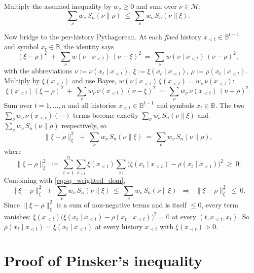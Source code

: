 \documentclass[fontsize=11pt, parskip=half]{scrartcl}
\renewcommand{\thesection}{\arabic{section}}
\newcommand{\Mc}{\mathcal{M}}
\newcommand{\Sn}[2]{S_{n}(#1 \parallel #2)}
\begin{document}
\begin{solution}
Multiply the assumed inequality by $w_\nu \geq 0$ and sum over $\nu \in \Mc$:
\begin{equation}\label{eq:sq_weighted_dom}
  \sum_\nu w_\nu\,\Sn{\nu}{\rho}
  ~\leq~
  \sum_\nu w_\nu\,\Sn{\nu}{\xi}.
\end{equation}

Now bridge to the per-history Pythagorean. At each \emph{fixed} history $x_{<t}
\in \mathbb{B}^{t-1}$ and symbol $x_t \in \mathbb{B}$, the identity says
\[
  (\xi - \rho)^2 \;+\; \sum_\nu w(\nu \mid x_{<t})\,(\nu - \xi)^2
  ~=~ \sum_\nu w(\nu \mid x_{<t})\,(\nu - \rho)^2,
\]
with the abbreviations $\nu := \nu(x_t \mid x_{<t})$, $\xi := \xi(x_t \mid x_{<t})$,
$\rho := \rho(x_t \mid x_{<t})$. Multiply by $\xi(x_{<t})$ and use Bayes,
$w(\nu \mid x_{<t})\,\xi(x_{<t}) = w_\nu \,\nu(x_{<t})$:
\[
  \xi(x_{<t})(\xi - \rho)^2
  \;+\; \sum_\nu w_\nu \,\nu(x_{<t})\,(\nu - \xi)^2
  ~=~ \sum_\nu w_\nu \,\nu(x_{<t})\,(\nu - \rho)^2.
\]
Sum over $t = 1, \dots, n$ and all histories $x_{<t} \in \mathbb{B}^{t-1}$ and
symbols $x_t \in \mathbb{B}$. The two $\sum_\nu w_\nu \,\nu(x_{<t})(\cdots)$
terms become exactly $\sum_\nu w_\nu \,\Sn{\nu}{\xi}$ and $\sum_\nu w_\nu \,
\Sn{\nu}{\rho}$ respectively, so
\[
  \|\xi - \rho\|_\xi^2
  \;+\; \sum_\nu w_\nu\,\Sn{\nu}{\xi}
  ~=~
  \sum_\nu w_\nu\,\Sn{\nu}{\rho},
\]
where
\[
  \|\xi - \rho\|_\xi^2 ~:=~
  \sum_{t=1}^n \sum_{x_{<t}} \xi(x_{<t}) \sum_{x_t}
    \bigl(\xi(x_t \mid x_{<t}) - \rho(x_t \mid x_{<t})\bigr)^2 ~\geq~ 0.
\]
Combining with \cref{eq:sq_weighted_dom},
\[
  \|\xi - \rho\|_\xi^2 \;+\; \sum_\nu w_\nu\,\Sn{\nu}{\xi}
  ~\leq~ \sum_\nu w_\nu\,\Sn{\nu}{\xi}
  \;\;\Longrightarrow\;\;
  \|\xi - \rho\|_\xi^2 ~\leq~ 0.
\]
Since $\|\xi - \rho\|_\xi^2$ is a sum of non-negative terms and is itself
$\leq 0$, every term vanishes:
$\xi(x_{<t})\bigl(\xi(x_t \mid x_{<t}) - \rho(x_t \mid x_{<t})\bigr)^2 = 0$
at every $(t, x_{<t}, x_t)$. So $\rho(x_t \mid x_{<t}) = \xi(x_t \mid x_{<t})$
at every history $x_{<t}$ with $\xi(x_{<t}) > 0$. \qedhere
\end{solution}

\clearpage
\appendix
\renewcommand{\thesection}{\Alph{section}}

\section{Proof of Pinsker's inequality}\label{app:pinsker}
\end{document}
